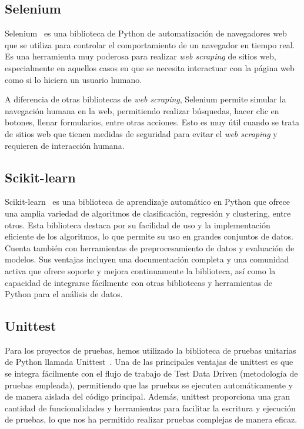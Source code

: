 \subsection{Selenium}

Selenium~\cite{selenium} es una biblioteca de Python de automatización de navegadores web que se utiliza para controlar el comportamiento de un navegador en tiempo real. Es una herramienta muy poderosa para realizar \textit{web scraping} de sitios web, especialmente en aquellos casos en que se necesita interactuar con la página web como si lo hiciera un usuario humano.

A diferencia de otras bibliotecas de \textit{web scraping}, Selenium permite simular la navegación humana en la web, permitiendo realizar búsquedas, hacer clic en botones, llenar formularios, entre otras acciones. Esto es muy útil cuando se trata de sitios web que tienen medidas de seguridad para evitar el \textit{web scraping} y requieren de interacción humana.

\subsection{Scikit-learn}

Scikit-learn~\cite{scikit} es una biblioteca de aprendizaje automático en Python que ofrece una amplia variedad de algoritmos de clasificación, regresión y clustering, entre otros. Esta biblioteca destaca por su facilidad de uso y la implementación eficiente de los algoritmos, lo que permite su uso en grandes conjuntos de datos. Cuenta también con herramientas de preprocesamiento de datos y evaluación de modelos. Sus ventajas incluyen una documentación completa y una comunidad activa que ofrece soporte y mejora continuamente la biblioteca, así como la capacidad de integrarse fácilmente con otras bibliotecas y herramientas de Python para el análisis de datos.

\subsection{Unittest}

Para los proyectos de pruebas, hemos utilizado la biblioteca de pruebas unitarias de Python llamada Unittest~\cite{unittest}. Una de las principales ventajas de unittest es que se integra fácilmente con el flujo de trabajo de Test Data Driven (metodología de pruebas empleada), permitiendo que las pruebas se ejecuten automáticamente y de manera aislada del código principal. Además, unittest proporciona una gran cantidad de funcionalidades y herramientas para facilitar la escritura y ejecución de pruebas, lo que nos ha permitido realizar pruebas complejas de manera eficaz.

